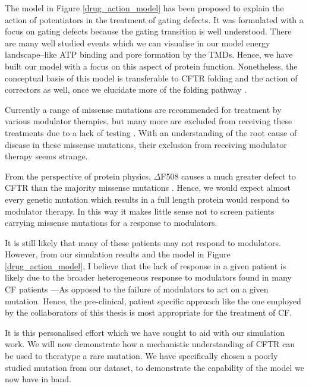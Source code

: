 The model in Figure \ref {drug_action_model} has been proposed to explain the action of potentiators in the treatment of gating defects. It was formulated with a focus on gating defects because the gating transition is well understood. There are many well studied events which we can visualise in our model energy landscape--like ATP binding and pore formation by the TMDs. Hence, we have built our model with a focus on this aspect of protein function. Nonetheless, the conceptual basis of this model is transferable to CFTR folding and the action of correctors as well, once we elucidate more of the folding pathway \cite{krainer2018, kleizen2021, kleizen2020, padanyi2022, fiedorczuk2022}. 

Currently a range of missense mutations are recommended for treatment by various modulator therapies, but many more are excluded from receiving these treatments due to a lack of testing \cite{trikafta_FDA_info, kalydeco_FDA_approval, vangoor2014}. With an understanding of the root cause of disease in these missense mutations, their exclusion from receiving modulator therapy seems strange.

From the perspective of protein physics, $\Delta$F508 causes a much greater defect to CFTR than the majority missense mutations \cite{bahia2021}. Hence, we would expect almost every genetic mutation which results in a full length protein would respond to modulator therapy. In this way it makes little sense not to screen patients carrying missense mutations for a response to modulators. 

It is still likely that many of these patients may not respond to modulators. However, from our simulation results and the model in Figure \ref{drug_action_model}, I believe that the lack of response  in a given patient is likely due to the broader heterogeneous response to modulators found in many CF patients \cite{boyle2014, donaldson2018, keating2018, matthes2018}---As opposed to the failure of modulators to act on a given mutation. Hence, the pre-clinical, patient specific approach like the one employed by the collaborators of this thesis is most appropriate for the treatment of CF. 

It is this personalised effort which we have sought to aid with our simulation work. We will now demonstrate how a mechanistic understanding of CFTR can be used to theratype a rare mutation. We have specifically chosen a poorly studied mutation from our dataset, to demonstrate the capability of the model we now have in hand. 

